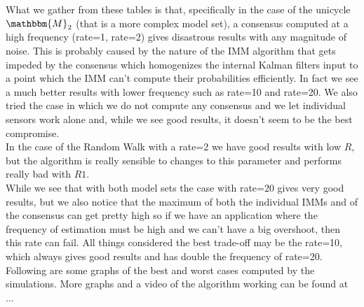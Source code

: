 \documentclass[twocolumn]{article}
\begin{document}
What we gather from these tables is that, specifically in the case of the unicycle $\mathbbm{M}_{2}$ (that is a more complex model set), 
a consensus computed at a high frequency (rate=1, rate=2) gives disastrous results with any magnitude of noise. This is probably caused by 
the nature of the IMM algorithm that gets impeded by the consensus which homogenizes the internal Kalman filters input to a point which 
the IMM can't compute their probabilities efficiently. In fact we see a much better results with lower frequency such as rate=10 and rate=20.
We also tried the case in which we do not compute any consensus and we let individual sensors work alone and, while we see good results, 
it doesn't seem to be the best compromise.
\\
In the case of the Random Walk with a rate=2 we have good results with low $R$, but the algorithm is really sensible to changes to this 
parameter and performs really bad with $R1$.
\\
While we see that with both model sets the case with rate=20 gives very good results, but we also notice that the maximum of both the individual 
IMMs and of the consensus can get pretty high so if we have an application where the frequency of estimation must be high and we can't 
have a big overshoot, then this rate can fail.
All things considered the best trade-off may be the rate=10, which always gives good results and has double the frequency of rate=20.
\\
Following are some graphs of the best and worst cases computed by the simulations. More graphs and a video of the algorithm working can 
be found at ... 
\end{document}
